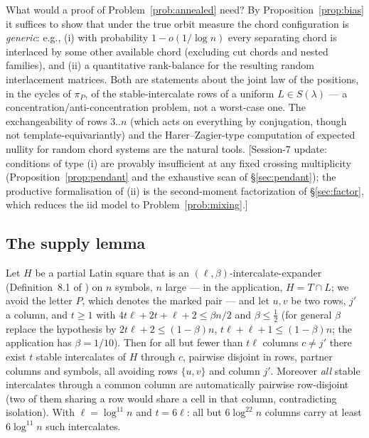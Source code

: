 What would a proof of Problem~\ref{prob:annealed} need?  By
Proposition~\ref{prop:bias} it suffices to show that under the true
orbit measure the chord configuration is \emph{generic}: e.g.,
(i) with probability $1-o(1/\log n)$ every separating chord is
interlaced by some other available chord (excluding cut chords and
nested families), and (ii) a quantitative rank-balance for the
resulting random interlacement matrices.  Both are statements about
the joint law of the positions, in the cycles of $\pi_P$, of the
stable-intercalate rows of a uniform $L\in S(\lambda)$ --- a
concentration/anti-concentration problem, not a worst-case one.  The
exchangeability of rows $3..n$ (which acts on everything by
conjugation, though not template-equivariantly) and the
Harer--Zagier-type computation of expected nullity for random chord
systems are the natural tools.  [Session-7 update: conditions of
type (i) are provably insufficient at any fixed crossing
multiplicity (Proposition~\ref{prop:pendant} and the exhaustive scan
of \S\ref{sec:pendant}); the productive formalisation of (ii) is the
second-moment factorization of \S\ref{sec:factor}, which reduces the
iid model to Problem~\ref{prob:mixing}.]

\subsection{The supply lemma}\label{sec:supply}

\begin{lemma}[supply]\label{lem:supply}
Let $H$ be a partial Latin square that is an
$(\ell,\beta)$-intercalate-expander (Definition~8.1 of
\cite{KPS25}) on $n$ symbols, $n$ large --- in the application,
$H=T\cap L$; we avoid the letter $P$, which denotes the marked pair
--- and let $u,v$ be two rows,
$j'$ a column, and $t\ge1$ with $4t\ell+2t+\ell+2\le\beta n/2$ and
$\beta\le\tfrac12$ (for general $\beta$ replace the hypothesis by
$2t\ell+2\le(1-\beta)n$, $t\ell+\ell+1\le(1-\beta)n$; the application
has $\beta=1/10$).  Then
for all but fewer than $t\ell$ columns $c\neq j'$ there exist $t$
stable intercalates of $H$ through $c$, pairwise disjoint in rows,
partner columns and symbols, all avoiding rows $\{u,v\}$ and column
$j'$.  Moreover \emph{all} stable intercalates through a common column
are automatically pairwise row-disjoint (two of them sharing a row
would share a cell in that column, contradicting isolation).
With $\ell=\log^{11}n$ and $t=6\ell$: all but $6\log^{22}n$ columns
carry at least $6\log^{11}n$ such intercalates.
\end{lemma}

